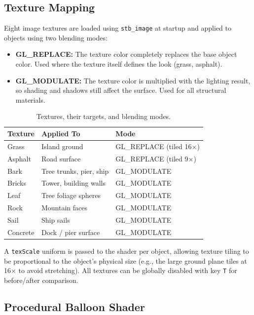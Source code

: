 \documentclass[12pt,a4paper]{article}
\begin{document}
\subsection{Texture Mapping}

Eight image textures are loaded using \texttt{stb\_image} at startup and applied to objects using two blending modes:

\begin{itemize}[noitemsep]
    \item \textbf{GL\_REPLACE:} The texture color completely replaces the base object color. Used where the texture itself defines the look (grass, asphalt).
    \item \textbf{GL\_MODULATE:} The texture color is multiplied with the lighting result, so shading and shadows still affect the surface. Used for all structural materials.
\end{itemize}

\begin{table}[h!]
\centering
\begin{tabular}{@{} l l l @{}}
\toprule
\textbf{Texture} & \textbf{Applied To} & \textbf{Mode} \\
\midrule
Grass    & Island ground              & GL\_REPLACE  (tiled 16$\times$) \\
Asphalt  & Road surface               & GL\_REPLACE  (tiled 9$\times$)  \\
Bark     & Tree trunks, pier, ship    & GL\_MODULATE \\
Bricks   & Tower, building walls      & GL\_MODULATE \\
Leaf     & Tree foliage spheres       & GL\_MODULATE \\
Rock     & Mountain faces             & GL\_MODULATE \\
Sail     & Ship sails                 & GL\_MODULATE \\
Concrete & Dock / pier surface        & GL\_MODULATE \\
\bottomrule
\end{tabular}
\caption{Textures, their targets, and blending modes.}
\end{table}

A \texttt{texScale} uniform is passed to the shader per object, allowing texture tiling to be proportional to the object's physical size (e.g., the large ground plane tiles at 16$\times$ to avoid stretching). All textures can be globally disabled with key \texttt{T} for before/after comparison.

\subsection{Procedural Balloon Shader}
\end{document}
